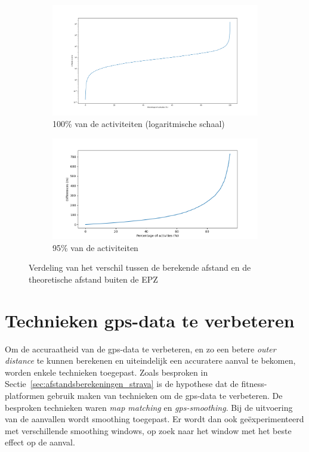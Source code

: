 \begin{figure}[h]
    \centering
    \begin{subfigure}{\textwidth}
        \includegraphics[width=\textwidth]{fig/Afwijkingen&Analyses/Graphs/100_Differences_tov_theoretische_BefSmoothening.png}
        \caption{100\% van de activiteiten (logaritmische schaal)}\label{fig:differences_log}
    \end{subfigure}
    \begin{subfigure}[b]{\textwidth}
        \includegraphics[width=\textwidth]{fig/Afwijkingen&Analyses/Graphs/95_Differences_tov_theoretische_BefSmoothening.png}
        \caption{95\% van de activiteiten}\label{fig:differences_nolog}
    \end{subfigure}
    \caption{Verdeling van het verschil tussen de berekende afstand en de theoretische afstand buiten de \ac{EPZ} }\label{fig:differences_theoretical}
\end{figure}

\section{Technieken gps-data te verbeteren}
Om de accuraatheid van de \ac{gps}-data te verbeteren, en zo een betere
\textit{outer distance} te kunnen berekenen en uiteindelijk een accuratere
aanval te bekomen, worden enkele technieken toegepast. Zoals besproken in
Sectie~\ref{sec:afstandsberekeningen_strava} is de hypothese dat de
fitness-platformen gebruik maken van technieken om de \ac{gps}-data te
verbeteren. De besproken technieken waren \textit{map matching} en
\textit{\ac{gps}-smoothing}. Bij de uitvoering van de aanvallen wordt smoothing
toegepast. Er wordt dan ook geëxperimenteerd met verschillende smoothing
windows, op zoek naar het window met het beste effect op de aanval.


